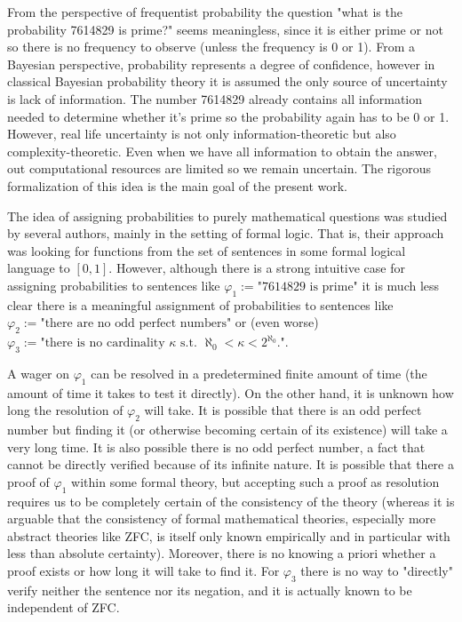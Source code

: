 \documentclass{article}
\theoremstyle{definition}
\theoremstyle{plain}
\begin{document}
From the perspective of frequentist probability the question "what is the probability 7614829 is prime?" seems meaningless, since it is either prime or not so there is no frequency to observe (unless the frequency is 0 or 1). From a Bayesian perspective, probability represents a degree of confidence, however in classical Bayesian probability theory it is assumed the only source of uncertainty is lack of information. The number 7614829 already contains all information needed to determine whether it's prime so the probability again has to be 0 or 1. However, real life uncertainty is not only information-theoretic but also complexity-theoretic. Even when we have all information to obtain the answer, out computational resources are limited so we remain uncertain. The rigorous formalization of this idea is the main goal of the present work.

The idea of assigning probabilities to purely mathematical questions was studied by several authors\cite{Gaifman_2004,Hutter_2013,Demski_2012,Christiano_2014,Garrabrant_2015}, mainly in the setting of formal logic. That is, their approach was looking for functions from the set of sentences in some formal logical language to $[0,1]$. However, although there is a strong intuitive case for assigning probabilities to sentences like $\varphi_1:=\text{"7614829 is prime"}$ it is much less clear there is a meaningful assignment of probabilities to sentences like $\varphi_2 := \text{"there are no odd perfect numbers"}$ or (even worse) $\varphi_3 := \text{"there is no cardinality } \kappa \text{ s.t. } \aleph_0 < \kappa < 2^{\aleph_0} \text{."}$.

A wager on $\varphi_1$ can be resolved in a predetermined finite amount of time (the amount of time it takes to test it directly). On the other hand, it is unknown how long the resolution of $\varphi_2$ will take. It is possible that there is an odd perfect number but finding it (or otherwise becoming certain of its existence) will take a very long time. It is also possible there is no odd perfect number, a fact that cannot be directly verified because of its infinite nature. It is possible that there a proof of $\varphi_1$ within some formal theory, but accepting such a proof as resolution requires us to be completely certain of the consistency of the theory (whereas it is arguable that the consistency of formal mathematical theories, especially more abstract theories like ZFC, is itself only known empirically and in particular with less than absolute certainty). Moreover, there is no knowing a priori whether a proof exists or how long it will take to find it. For $\varphi_3$ there is no way to "directly" verify neither the sentence nor its negation, and it is actually known to be independent of ZFC.
\end{document}
